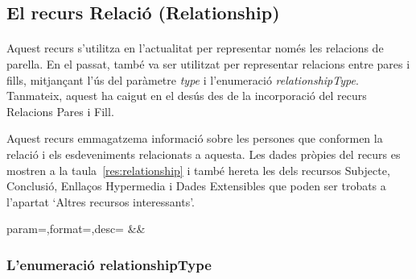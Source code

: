 \subsection{El recurs Relació (Relationship)}

    \paragraph{}
    Aquest recurs s'utilitza en l'actualitat per representar només les relacions de parella. En el passat, també va ser utilitzat per representar relacions entre pares i fills, mitjançant l'ús del paràmetre \emph{type} i l'enumeració \emph{relationshipType}. Tanmateix, aquest ha caigut en el desús des de la incorporació del recurs Relacions Pares i Fill.

    Aquest recurs emmagatzema informació sobre les persones que conformen la relació i els esdeveniments relacionats a aquesta. Les dades pròpies del recurs es mostren a la taula~\ref{res:relationship} i també hereta les dels recursos Subjecte, Conclusió, Enllaços Hypermedia i Dades Extensibles que poden ser trobats a l'apartat `Altres recursos interessants'.

    \begin{center}
             {param=\param,format=\format,desc=\desc}
             {\param&\format&\desc}
     \end{center}

     \clearpage


    \subsubsection{L'enumeració relationshipType}

